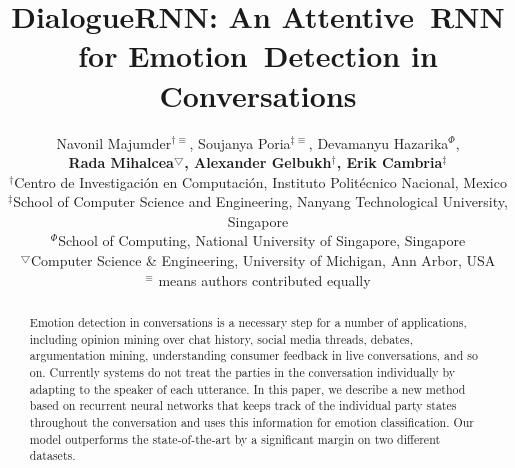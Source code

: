 \documentclass[letterpaper]{article} %
\begin{document}
\title{DialogueRNN: An Attentive~RNN for Emotion~Detection in Conversations}
\author{Navonil Majumder$^{\dagger\equiv}$, Soujanya Poria$^{\ddagger\equiv}$, Devamanyu Hazarika$^{\Phi}$,\\\textbf{\Large Rada Mihalcea$^{\bigtriangledown}$, Alexander Gelbukh$^{\dagger}$,  Erik Cambria$^{\ddagger}$}\\
$^{\dagger}$Centro de Investigaci\'on en Computaci\'on, Instituto Polit\'ecnico Nacional, Mexico\\
$^{\ddagger}$School of Computer Science and Engineering, Nanyang Technological University, Singapore \\ 
$^{\Phi}$School of Computing, National University of Singapore, Singapore \\
$^{\bigtriangledown}$Computer Science \& Engineering, University of Michigan, Ann Arbor, USA\\
$^{\equiv}$ means authors contributed equally
}
\maketitle

\begin{abstract}

Emotion detection in conversations is a necessary step for a number of applications, including opinion mining
over chat history, social media threads, debates, argumentation mining, understanding consumer feedback
in live conversations, and so on. Currently systems do not treat the parties in the conversation individually by adapting to the speaker of each utterance. In this paper, we describe a new method based on recurrent neural networks that
keeps track of the individual party states throughout the conversation and uses this
information for emotion classification. Our model outperforms
the state-of-the-art by a significant margin on two different datasets. 

\end{abstract}
\end{document}

